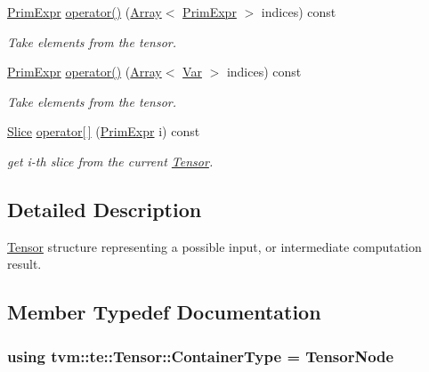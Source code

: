 \begin{DoxyCompactItemize}
\hyperlink{classtvm_1_1PrimExpr}{Prim\+Expr} \hyperlink{classtvm_1_1te_1_1Tensor_aef881cbdd900afba307d07372e6d0710}{operator()} (\hyperlink{classtvm_1_1Array}{Array}$<$ \hyperlink{classtvm_1_1PrimExpr}{Prim\+Expr} $>$ indices) const 
\begin{DoxyCompactList}\small\item\em Take elements from the tensor. \end{DoxyCompactList}\item 
\hyperlink{classtvm_1_1PrimExpr}{Prim\+Expr} \hyperlink{classtvm_1_1te_1_1Tensor_a2833a614926eca85a2e8bd4c9af667b0}{operator()} (\hyperlink{classtvm_1_1Array}{Array}$<$ \hyperlink{classtvm_1_1tir_1_1Var}{Var} $>$ indices) const 
\begin{DoxyCompactList}\small\item\em Take elements from the tensor. \end{DoxyCompactList}\item 
\hyperlink{classtvm_1_1te_1_1Tensor_1_1Slice}{Slice} \hyperlink{classtvm_1_1te_1_1Tensor_a2186a1bbc39673d9e39eafe7a01fed91}{operator\mbox{[}$\,$\mbox{]}} (\hyperlink{classtvm_1_1PrimExpr}{Prim\+Expr} i) const 
\begin{DoxyCompactList}\small\item\em get i-\/th slice from the current \hyperlink{classtvm_1_1te_1_1Tensor}{Tensor}. \end{DoxyCompactList}\end{DoxyCompactItemize}


\subsection{Detailed Description}
\hyperlink{classtvm_1_1te_1_1Tensor}{Tensor} structure representing a possible input, or intermediate computation result. 

\subsection{Member Typedef Documentation}
\subsubsection[{\texorpdfstring{Container\+Type}{ContainerType}}]{\setlength{\rightskip}{0pt plus 5cm}using {\bf tvm\+::te\+::\+Tensor\+::\+Container\+Type} =  {\bf Tensor\+Node}}\hypertarget{classtvm_1_1te_1_1Tensor_a79078835ab113994887e66878e2a87ab}{}\label{classtvm_1_1te_1_1Tensor_a79078835ab113994887e66878e2a87ab}


